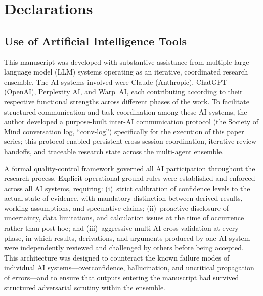 \documentclass[aps,prd,twocolumn,superscriptaddress,nofootinbib,floatfix]{revtex4-2}
\begin{document}
\section*{Declarations}

\subsection*{Use of Artificial Intelligence Tools}

This manuscript was developed with substantive assistance from multiple large language
model (LLM) systems operating as an iterative, coordinated research ensemble. The AI
systems involved were Claude (Anthropic), ChatGPT (OpenAI), Perplexity AI, and Warp~AI,
each contributing according to their respective functional strengths across different
phases of the work. To facilitate structured communication and task coordination among
these AI systems, the author developed a purpose-built inter-AI communication protocol
(the Society of Mind conversation log, ``conv-log'') specifically for the execution of
this paper series; this protocol enabled persistent cross-session coordination, iterative
review handoffs, and traceable research state across the multi-agent ensemble.

A formal quality-control framework governed all AI participation throughout the research
process. Explicit operational ground rules were established and enforced across all AI
systems, requiring: (i)~strict calibration of confidence levels to the actual state of
evidence, with mandatory distinction between derived results, working assumptions, and
speculative claims; (ii)~proactive disclosure of uncertainty, data limitations, and
calculation issues at the time of occurrence rather than post hoc; and
(iii)~aggressive multi-AI cross-validation at every phase, in which results, derivations,
and arguments produced by one AI system were independently reviewed and challenged by
others before being accepted. This architecture was designed to counteract the known
failure modes of individual AI systems---overconfidence, hallucination, and uncritical
propagation of errors---and to ensure that outputs entering the manuscript had survived
structured adversarial scrutiny within the ensemble.
\end{document}
